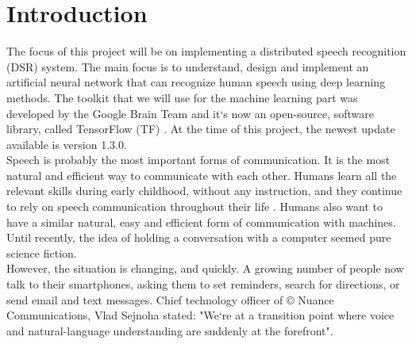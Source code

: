 \chapter{Introduction}\label{ch:introduction}

The focus of this project will be on implementing a distributed speech recognition (DSR) system.
The main focus is to understand, design and implement an artificial neural network that can recognize human speech using deep learning methods.
The toolkit that we will use for the machine learning part was developed by the Google Brain Team and it`s now an open-source, software library, called TensorFlow (TF) \cite{tensorflow2015-whitepaper}.
At the time of this project, the newest update available is version 1.3.0.\\

Speech is probably the most important forms of communication.
It is the most natural and efficient way to communicate with
each other. Humans learn all the relevant skills during early
childhood, without any instruction, and they continue to rely
on speech communication throughout their life \cite{kamblespeech}.
Humans also want to have a similar natural, easy and efficient form of communication with machines. 
Until recently, the idea of holding a conversation with a computer seemed pure science fiction.\\

However, the situation is changing, and quickly.
A growing number of people now talk to their smartphones, asking them to set reminders, search for directions, or send email and text messages.
Chief technology officer of \copyright{} Nuance Communications, Vlad Sejnoha stated: "We`re at a transition point where voice and natural-language understanding are suddenly at the forefront".\cite{kamblespeech}
 






